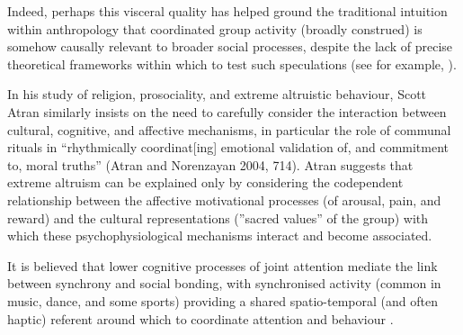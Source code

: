 Indeed, perhaps this visceral quality has helped ground the traditional intuition within anthropology that coordinated group activity (broadly construed) is somehow causally relevant to broader social processes, despite the lack of precise theoretical frameworks within which to test such speculations (see for example, \citep{Durkheim1965,Mauss1935,Radcliffe-Brown1952,Turner1974,Merleau-Ponty1956,Bourdieu1990}).

In his study of religion, prosociality, and extreme altruistic behaviour, Scott Atran similarly insists on the need to carefully consider the interaction between cultural, cognitive, and affective mechanisms, in particular the role of communal rituals in ``rhythmically coordinat[ing] emotional validation of, and commitment to, moral truths'' (Atran and Norenzayan 2004, 714). Atran suggests that extreme altruism can be explained only by considering the codependent relationship between the affective motivational processes (of arousal, pain, and reward) and the cultural representations (''sacred values'' of the group) with which these psychophysiological mechanisms interact and become associated.




It is believed that lower cognitive processes of joint attention mediate the link between synchrony and social bonding, with synchronised activity (common in music, dance, and some sports) providing a shared spatio-temporal (and often haptic) referent around which to coordinate attention and behaviour \cite{Launay2016,Wolf2015}.


